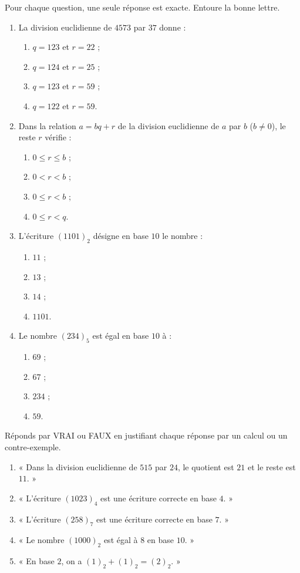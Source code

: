 \documentclass[11pt]{article}
\begin{document}
\begin{exercice}
Pour chaque question, une seule réponse est exacte. Entoure la bonne lettre.
\begin{enumerate}
\item La division euclidienne de $4573$ par $37$ donne :
\begin{enumerate}
\item $q = 123$ et $r = 22$ ;
\item $q = 124$ et $r = 25$ ;
\item $q = 123$ et $r = 59$ ;
\item $q = 122$ et $r = 59$.
\end{enumerate}
\item Dans la relation $a = bq + r$ de la division euclidienne de $a$ par $b$ ($b \neq 0$), le reste $r$ vérifie :
\begin{enumerate}
\item $0 \le r \le b$ ;
\item $0 < r < b$ ;
\item $0 \le r < b$ ;
\item $0 \le r < q$.
\end{enumerate}
\item L'écriture $(1101)_2$ désigne en base $10$ le nombre :
\begin{enumerate}
\item $11$ ;
\item $13$ ;
\item $14$ ;
\item $1101$.
\end{enumerate}
\item Le nombre $(234)_5$ est égal en base $10$ à :
\begin{enumerate}
\item $69$ ;
\item $67$ ;
\item $234$ ;
\item $59$.
\end{enumerate}
\end{enumerate}
\end{exercice}

\begin{exercice}
Réponds par VRAI ou FAUX en justifiant chaque réponse par un calcul ou un contre-exemple.
\begin{enumerate}
\item « Dans la division euclidienne de $515$ par $24$, le quotient est $21$ et le reste est $11$. »
\item « L'écriture $(1023)_4$ est une écriture correcte en base $4$. »
\item « L'écriture $(258)_7$ est une écriture correcte en base $7$. »
\item « Le nombre $(1000)_2$ est égal à $8$ en base $10$. »
\item « En base $2$, on a $(1)_2 + (1)_2 = (2)_2$. »
\end{enumerate}
\end{exercice}
\end{document}
